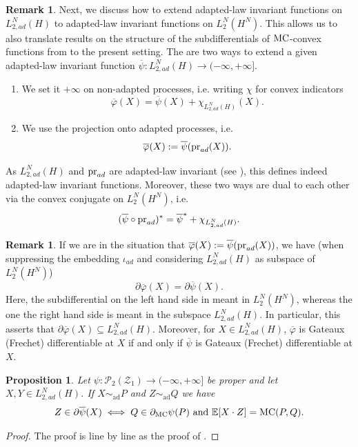 \documentclass[a4paper]{amsart}
\numberwithin{theorem}{section}
\newtheorem{proposition}[theorem]{Proposition}
\theoremstyle{definition}
\newtheorem{remark}[theorem]{Remark}
\newcommand{\E}{\mathbb{E}}
\newcommand{\pr}{\textup{pr}}
\newcommand{\Pc}{\mathcal P}
\renewcommand{\subset}{\subseteq}
\newcommand{\simad}{\sim_{\mathrm{ad}}}
\renewcommand{\H}{H}
\renewcommand{\phi}{\varphi}
\newcommand{\mc}{\textup{MC}}
\newcommand{\Zc}{\mathcal{Z}}
\begin{document}
\begin{remark}\label{rem:different_exts}
Next, we discuss how to extend adapted-law invariant functions on $L_{2,ad}^N(\H)$ to adapted-law  invariant functions on $L_{2}^N(\H^N)$. This  allows us to also translate results on the structure of the subdifferentials of $\mc$-convex functions from  to the present setting. The are two ways to extend a given adapted-law invariant function $\overline{\psi} : L_{2,ad}^N(H) \to (-\infty,+\infty]$.
\begin{enumerate}
    \item We set it $+\infty$ on non-adapted processes, i.e. writing $\chi$ for convex indicators
    \[
    \overline{\phi}(X) = \overline{\psi}(X) + \chi_{L_{2,ad}^N(H)}(X).
    \]
    \item We use the projection onto adapted processes, i.e.
    \[
\overline{\phi}(X) := \overline{\psi}(\pr_{ad}(X)).
\]
\end{enumerate}
As $L_{2,ad}^N(H)$ and $\pr_{ad}$ are adapted-law invariant (see ), this defines indeed adapted-law invariant functions. Moreover, these two ways are dual to each other via the convex conjugate on $L_2^N(H^N)$, i.e.
\[
(\overline{\psi} \circ \pr_{ad})^\ast = \overline{\psi}^\ast + \chi_{L_{2,ad}^N(H)}.
\]
\end{remark}

\begin{remark}\label{rem:dfb_equiv_extend}
If we are in the situation that $\overline{\phi}(X) := \overline{\psi}(\pr_{ad}(X))$, we have (when suppressing the embedding $\iota_{ad}$ and considering $L_{2,ad}^N(H)$ as subspace of $L_2^N(H^N)$)
\[
\partial \overline{\phi}(X) = \partial\overline{\psi}(X).
\]
Here, the subdifferential on the left hand side in meant in $L_{2}^N(H^N)$, whereas the one the right hand side is meant in the subspace $L_{2,ad}^N(H)$. In particular, this asserts that $\partial \overline{\phi}(X) \subset L_{2,ad}^N(H)$. Moreover, for $X \in L_{2,ad}^N(H)$, $\overline\phi$ is Gateaux (Frechet) differentiable at $X$ if and only if $\overline\psi$ is Gateaux (Frechet) differentiable at $X$. 
\end{remark}



\begin{proposition}\label{prop:subdiff_char_FP}
Let $\psi : \Pc_2(\Zc_1) \to (-\infty, +\infty]$ be proper and let $X,Y \in L_{2,ad}^N(\H)$. If $X \simad P$ and $Z \simad Q$ we have
\[
Z \in \partial \overline{\psi}(X) \iff Q \in \partial_{\mc} \psi(P) \text{ and } \E[X \cdot Z] = \mc(P,Q). 
\]
\end{proposition}
\begin{proof}
The proof is line by line as the proof of .    
\end{proof}
\end{document}
